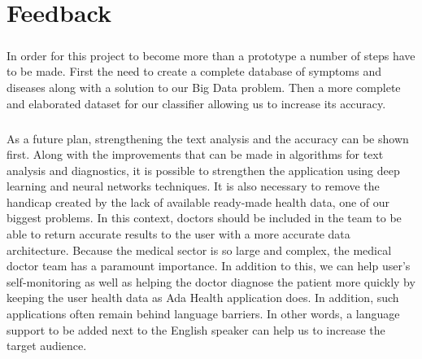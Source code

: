 \chapter{Feedback}

\paragraph{}
In order for this project to become more than a prototype a number of steps have to be made. First the need to create a complete database of symptoms and diseases along with a solution to our Big Data problem. Then a more complete and elaborated dataset for our classifier allowing us to increase its accuracy. 

\paragraph{}
As	a	future	plan,	strengthening	the	text	analysis	and	the	accuracy	can	be	shown	first.	Along	with	the	improvements	that	can	be	made	in	algorithms	for	text	analysis	and	diagnostics,	it	is	possible	to	strengthen	the	application	using	deep	learning	and	neural	networks	techniques.	It	is	also	necessary	to	remove	the	handicap	created	by	the	lack	of	available	ready-made	health	data,	one	of	our	biggest	problems.	In	this	context,	doctors	should	be	included	in	the	team	to	be	able	to	return	accurate	results	to	the	user	with	a	more	accurate	data	architecture.	Because	the	medical	sector	is	so	large	and	complex,	the	medical	doctor	team	has	a	paramount	importance.	In	addition	to	this,	we	can	help	user's	self-monitoring	as	well	as	helping	the	doctor	diagnose	the	patient	more	quickly	by	keeping	the	user	health	data	as	Ada	Health	application	does.		In	addition,	such	applications	often	remain	behind	language	barriers.	In	other	words,	a	language	support	to	be	added	next	to	the	English	speaker	can	help	us	to	increase	the	target	audience.	

